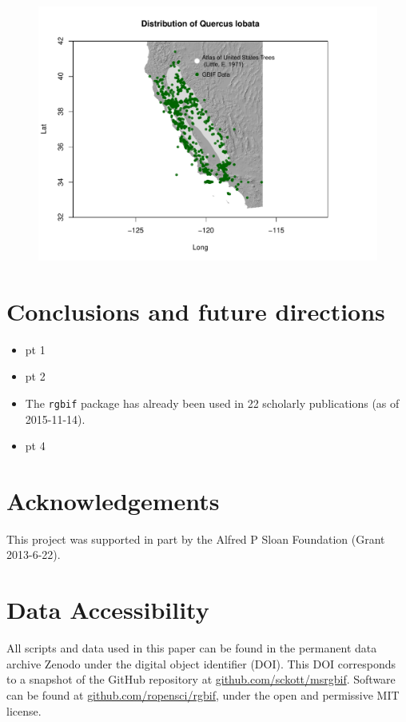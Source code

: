 \documentclass[author-year, review, 11pt]{components/elsarticle} %
\makeatletter
\def\maxwidth{\ifdim\Gin@nat@width>\linewidth\linewidth
\else\Gin@nat@width\fi}
\let\Oldincludegraphics\includegraphics
\renewcommand{\includegraphics}[1]{\Oldincludegraphics[width=\maxwidth]{#1}}
\makeatother
\begin{document}
\begin{figure}[htbp]
\centering
\includegraphics{components/figure/manuscript-unnamed-chunk-37-1.pdf}
\caption{}
\end{figure}

\section{Conclusions and future
directions}\label{conclusions-and-future-directions}

\begin{itemize}
\itemsep1pt\parskip0pt
\item
  pt 1
\item
  pt 2
\item
  The \texttt{rgbif} package has already been used in 22 scholarly
  publications (as of 2015-11-14).
\item
  pt 4
\end{itemize}

\section{Acknowledgements}\label{acknowledgements}

This project was supported in part by the Alfred P Sloan Foundation
(Grant 2013-6-22).

\section{Data Accessibility}\label{data-accessibility}

All scripts and data used in this paper can be found in the permanent
data archive Zenodo under the digital object identifier (DOI). This DOI
corresponds to a snapshot of the GitHub repository at
\href{https://github.com/sckott/msrgbif}{github.com/sckott/msrgbif}.
Software can be found at
\href{https://github.com/ropensci/rgbif}{github.com/ropensci/rgbif},
under the open and permissive MIT license.
\end{document}
